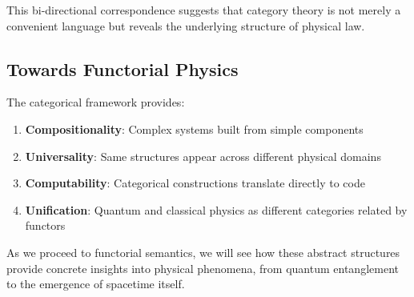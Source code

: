 This bi-directional correspondence suggests that category theory is not merely a convenient language but reveals the underlying structure of physical law.

\subsection{Towards Functorial Physics}

The categorical framework provides:

\begin{enumerate}[leftmargin=*]
\item \textbf{Compositionality}: Complex systems built from simple components
\item \textbf{Universality}: Same structures appear across different physical domains
\item \textbf{Computability}: Categorical constructions translate directly to code
\item \textbf{Unification}: Quantum and classical physics as different categories related by functors
\end{enumerate}

As we proceed to functorial semantics, we will see how these abstract structures provide concrete insights into physical phenomena, from quantum entanglement to the emergence of spacetime itself.